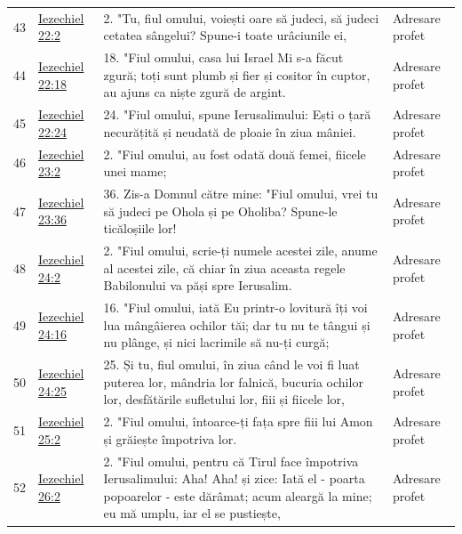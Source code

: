 \documentclass[12pt,a4paper,twoside,openany]{book}
\begin{document}
\begin{longtable}{L{0.8cm}L{1.2cm}L{11.9cm}L{0.8cm}}
43 & \href{https://bibliaortodoxa.ro/carte.php?id=33\&cap=22\#2}{Iezechiel 22:2} & 2. "Tu, fiul omului, voiești oare să judeci, să judeci cetatea sângelui? Spune-i toate urâciunile ei, & Adresare profet \\
44 & \href{https://bibliaortodoxa.ro/carte.php?id=33\&cap=22\#18}{Iezechiel 22:18} & 18. "Fiul omului, casa lui Israel Mi s-a făcut zgură; toți sunt plumb și fier și cositor în cuptor, au ajuns ca niște zgură de argint. & Adresare profet \\
45 & \href{https://bibliaortodoxa.ro/carte.php?id=33\&cap=22\#24}{Iezechiel 22:24} & 24. "Fiul omului, spune Ierusalimului: Ești o țară necurățită și neudată de ploaie în ziua mâniei. & Adresare profet \\
46 & \href{https://bibliaortodoxa.ro/carte.php?id=33\&cap=23\#2}{Iezechiel 23:2} & 2. "Fiul omului, au fost odată două femei, fiicele unei mame; & Adresare profet \\
47 & \href{https://bibliaortodoxa.ro/carte.php?id=33\&cap=23\#36}{Iezechiel 23:36} & 36. Zis-a Domnul către mine: "Fiul omului, vrei tu să judeci pe Ohola și pe Oholiba? Spune-le ticăloșiile lor! & Adresare profet \\
48 & \href{https://bibliaortodoxa.ro/carte.php?id=33\&cap=24\#2}{Iezechiel 24:2} & 2. "Fiul omului, scrie-ți numele acestei zile, anume al acestei zile, că chiar în ziua aceasta regele Babilonului va păși spre Ierusalim. & Adresare profet \\
49 & \href{https://bibliaortodoxa.ro/carte.php?id=33\&cap=24\#16}{Iezechiel 24:16} & 16. "Fiul omului, iată Eu printr-o lovitură îți voi lua mângâierea ochilor tăi; dar tu nu te tângui și nu plânge, și nici lacrimile să nu-ți curgă; & Adresare profet \\
50 & \href{https://bibliaortodoxa.ro/carte.php?id=33\&cap=24\#25}{Iezechiel 24:25} & 25. Și tu, fiul omului, în ziua când le voi fi luat puterea lor, mândria lor falnică, bucuria ochilor lor, desfătările sufletului lor, fiii și fiicele lor, & Adresare profet \\
51 & \href{https://bibliaortodoxa.ro/carte.php?id=33\&cap=25\#2}{Iezechiel 25:2} & 2. "Fiul omului, întoarce-ți fața spre fiii lui Amon și grăiește împotriva lor. & Adresare profet \\
52 & \href{https://bibliaortodoxa.ro/carte.php?id=33\&cap=26\#2}{Iezechiel 26:2} & 2. "Fiul omului, pentru că Tirul face împotriva Ierusalimului: Aha! Aha! și zice: Iată el - poarta popoarelor - este dărâmat; acum aleargă la mine; eu mă umplu, iar el se pustiește, & Adresare profet \\

\end{longtable}
\end{document}
